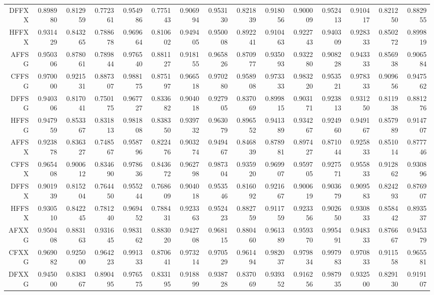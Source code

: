 {\begin{tabular}{rrrrrrrrrrrrrrr}
	DFFXX & 0.898980 & 0.812959 & 0.772361 & 0.954986 & 0.775143 & 0.906994 & 0.953130 & 0.821839 & 0.918056 & 0.900009 & 0.952413 & 0.910417 & 0.821250 & 0.882955 \\ 
	HFFXX & 0.931429 & 0.843265 & 0.788678 & 0.969664 & 0.810602 & 0.949405 & 0.950008 & 0.892241 & 0.910463 & 0.922743 & 0.940309 & 0.928333 & 0.850272 & 0.899819 \\ 
	AFFSG & 0.950306 & 0.878061 & 0.789844 & 0.976540 & 0.881127 & 0.918155 & 0.965826 & 0.870977 & 0.935093 & 0.932280 & 0.908228 & 0.943333 & 0.856938 & 0.906584 \\ 
	CFFSG & 0.970000 & 0.921531 & 0.887307 & 0.988175 & 0.875197 & 0.966518 & 0.970280 & 0.958908 & 0.973333 & 0.983220 & 0.953521 & 0.978333 & 0.909656 & 0.947562 \\ 
	DFFSG & 0.940306 & 0.817041 & 0.750175 & 0.967727 & 0.833682 & 0.904018 & 0.927905 & 0.837069 & 0.899815 & 0.903171 & 0.923813 & 0.931250 & 0.811938 & 0.881276 \\ 
	HFFSG & 0.947959 & 0.853367 & 0.831813 & 0.981808 & 0.838350 & 0.939732 & 0.963079 & 0.896552 & 0.941389 & 0.934267 & 0.924960 & 0.949167 & 0.857989 & 0.914707 \\ 
	AFFSX & 0.923878 & 0.836327 & 0.748567 & 0.958796 & 0.822476 & 0.903274 & 0.949467 & 0.846839 & 0.878981 & 0.897427 & 0.871044 & 0.925833 & 0.851014 & 0.877746 \\ 
	CFFSX & 0.965408 & 0.900612 & 0.834690 & 0.978636 & 0.843672 & 0.962798 & 0.987304 & 0.935920 & 0.969907 & 0.959705 & 0.927571 & 0.955833 & 0.912862 & 0.930896 \\ 
	DFFSX & 0.901939 & 0.815204 & 0.764450 & 0.955244 & 0.768609 & 0.904018 & 0.953546 & 0.816092 & 0.921667 & 0.900619 & 0.903679 & 0.909583 & 0.824293 & 0.876907 \\ 
	HFFSX & 0.930510 & 0.842245 & 0.781240 & 0.969452 & 0.788431 & 0.923363 & 0.952423 & 0.882759 & 0.911759 & 0.923356 & 0.902650 & 0.930833 & 0.858442 & 0.893537 \\ 
	AFXXG & 0.950408 & 0.883163 & 0.931645 & 0.983162 & 0.883020 & 0.942708 & 0.968115 & 0.880460 & 0.961389 & 0.959370 & 0.995491 & 0.948333 & 0.876667 & 0.945379 \\ 
	CFXXG & 0.969082 & 0.925000 & 0.964223 & 0.991333 & 0.870641 & 0.973214 & 0.970529 & 0.961494 & 0.982037 & 0.979834 & 0.997983 & 0.970833 & 0.911558 & 0.965581 \\ 
	DFXXG & 0.945000 & 0.838367 & 0.890495 & 0.976575 & 0.833195 & 0.918899 & 0.938728 & 0.837069 & 0.939352 & 0.916256 & 0.987935 & 0.932500 & 0.829130 & 0.919107 \\ 

\end{tabular}}
